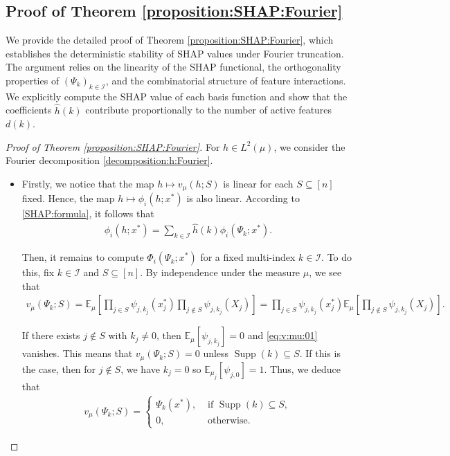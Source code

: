 \documentclass[letterpaper,11pt]{article}
\numberwithin{equation}{section}
\newcommand{\supp}{\operatorname{Supp}}
\numberwithin{equation}{section}
\begin{document}
\subsection{Proof of Theorem \ref{proposition:SHAP:Fourier}}

We provide the detailed proof of Theorem \ref{proposition:SHAP:Fourier}, which establishes the deterministic stability of SHAP values under Fourier truncation. The argument relies on the linearity of the SHAP functional, the orthogonality properties of $(\Psi_k)_{k\in \mathcal{I}}$, and the combinatorial structure of feature interactions. We explicitly compute the SHAP value of each basis function and show that the coefficients $\hat{h}(k)$ contribute proportionally to the number of active features $d(k)$.

\begin{proof}[Proof of Theorem \ref{proposition:SHAP:Fourier}]
    For $h\in L^2(\mu)$, we consider the Fourier decomposition \eqref{decomposition:h:Fourier}.
    \begin{itemize}
    \item[(a)] Firstly, we notice that the map $h\mapsto v_\mu(h;S)$ is linear for each $S\subseteq [n]$ fixed. Hence, the map $ h\mapsto \phi_i(h;x^*)$ is also linear. According to \eqref{SHAP:formula}, it follows that 
    \begin{align}
        \label{SHAP:formula:Fourier:basis}
        \phi_i(h;x^*)=\sum_{k\in \mathcal{I}} \hat{h}(k) \phi_i (\Psi_k;x^*).
    \end{align}

    Then, it remains to compute $\Phi_i(\Psi_k;x^*)$ for a fixed multi-index $k\in \mathcal{I}$. To do this, fix $k\in \mathcal{I}$ and $S\subseteq [n]$. By independence under the measure $\mu$, we see that 
    \begin{align}
        \label{eq:v:mu:01}
        v_\mu (\Psi_k;S)= \mathbb{E}_\mu \left[ \prod_{j\in S} \psi_{j,k_j}(x_j^*) \prod _{j\notin S} \psi_{j,k_j}(X_j) \right]= \prod_{j\in S} \psi_{j,k_j}(x_j^*) \mathbb{E}_\mu\left[\prod _{j\notin S} \psi_{j,k_j}(X_j)\right]. 
    \end{align}

    If there exists $j\notin S$ with $k_j\neq 0$, then $\mathbb{E}_\mu [\psi_{j,k_j}]=0$ and \eqref{eq:v:mu:01} vanishes. This means that $v_{\mu}(\Psi_k;S)=0$ unless $\supp(k)\subseteq S$. If this is the case, then for $j\notin S$, we have $k_j=0$ so $\mathbb{E}_{\mu_j}[\psi_{j,0}]=1$. Thus, we deduce that
    \begin{align}
        \label{eq:v:mu:def}
        v_\mu (\Psi_k; S)=\begin{cases}
            \Psi_k(x^*),&\text{ if }\supp(k)\subseteq S,\\
            0,&\text{ otherwise.}
        \end{cases}
    \end{align}
    

\end{itemize}
\end{proof}
\end{document}
